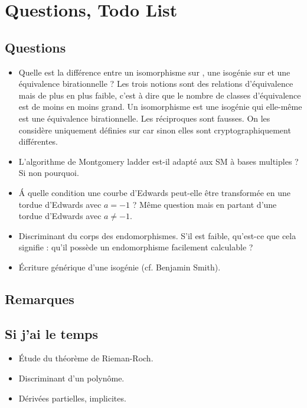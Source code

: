 \chapter{Questions, Todo List}

\section{Questions}
\begin{itemize}[label=--]
    \item Quelle est la différence entre un isomorphisme sur \field{}, une isogénie sur \field{} et une équivalence birationnelle \field{} ? Les trois notions sont des relations d'équivalence mais de plus en plus faible, c'est à dire que le nombre de classes d'équivalence est de moins en moins grand. Un isomorphisme est une isogénie qui elle-même est une équivalence birationnelle. Les réciproques sont fausses. On les considère uniquement définies sur  car sinon elles sont cryptographiquement différentes. 
    \item L'algorithme de Montgomery ladder est-il adapté aux SM à bases multiples ? Si non pourquoi.
    \item \'A quelle condition une courbe d'Edwards peut-elle être transformée en une tordue d'Edwards avec $a=-1$ ? Même question mais en partant d'une tordue d'Edwards avec $a\neq-1$.
    \item Discriminant du corps des endomorphismes. S'il est faible, qu'est-ce que cela signifie : qu'il possède un endomorphisme facilement calculable ?
    \item \'Ecriture générique d'une isogénie (cf. Benjamin Smith).
\end{itemize}


\section{Remarques}



\section{Si j'ai le temps}
\begin{itemize}[label=--]
    \item \'Etude du théorème de Rieman-Roch.
    \item Discriminant d'un polynôme.
    \item Dérivées partielles, implicites.
\end{itemize}